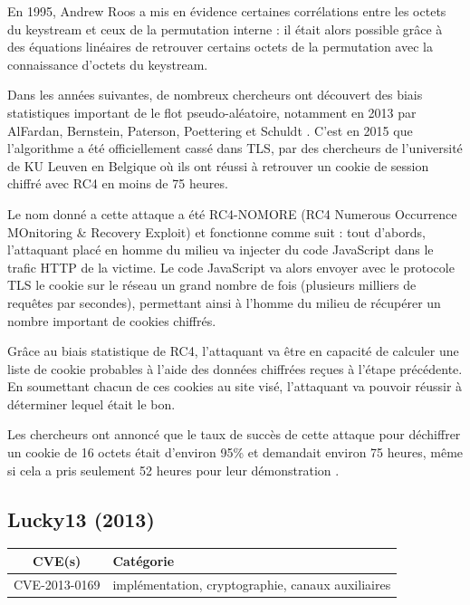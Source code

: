 En 1995, Andrew Roos a mis en évidence certaines corrélations entre les octets du keystream et ceux de la permutation interne : il était alors possible grâce à des équations linéaires de retrouver certains octets de la permutation avec la connaissance d'octets du keystream.

Dans les années suivantes, de nombreux chercheurs ont découvert des biais statistiques important de le flot pseudo-aléatoire, notamment en 2013 par AlFardan, Bernstein, Paterson, Poettering et Schuldt \cite{rc4}. C'est en 2015 que l'algorithme a été officiellement cassé dans TLS, par des chercheurs de l'université de KU Leuven en Belgique où ils ont réussi à retrouver un cookie de session chiffré avec RC4 en moins de 75 heures.

Le nom donné a cette attaque a été RC4-NOMORE (RC4 Numerous Occurrence MOnitoring \& Recovery Exploit) et fonctionne comme suit : tout d'abords, l'attaquant placé en homme du milieu va injecter du code JavaScript dans le trafic HTTP de la victime. Le code JavaScript va alors envoyer avec le protocole TLS le cookie sur le réseau un grand nombre de fois (plusieurs milliers de requêtes par secondes), permettant ainsi à l'homme du milieu de récupérer un nombre important de cookies chiffrés.

Grâce au biais statistique de RC4, l'attaquant va être en capacité de calculer une liste de cookie probables à l'aide des données chiffrées reçues à l'étape précédente. En soumettant chacun de ces cookies au site visé, l'attaquant va pouvoir réussir à déterminer lequel était le bon.

Les chercheurs ont annoncé que le taux de succès de cette attaque pour déchiffrer un cookie de 16 octets était d'environ 95\% et demandait environ 75 heures, même si cela a pris seulement 52 heures pour leur démonstration \cite{rc4nomore}.




\subsection{Lucky13 (2013)}

\begin{tabularx}{0.96\textwidth}{|c|X|}
  \hline
  \textbf{CVE(s)} & \textbf{Catégorie} \\
  \hline
  CVE-2013-0169 & implémentation, cryptographie, canaux auxiliaires \\
  \hline
\end{tabularx}

